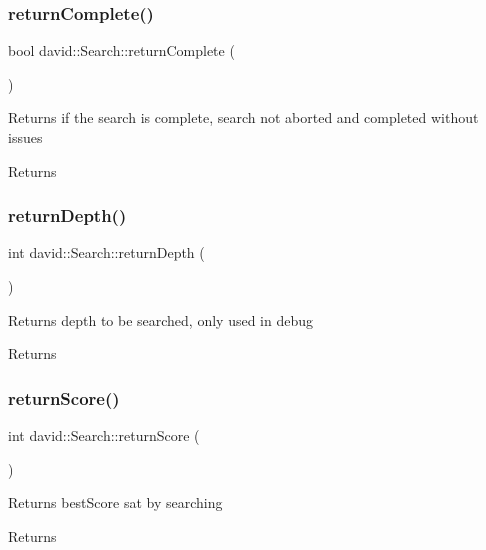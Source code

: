 \subsubsection{\texorpdfstring{return\+Complete()}{returnComplete()}}
{\footnotesize\ttfamily bool david\+::\+Search\+::return\+Complete (\begin{DoxyParamCaption}{ }\end{DoxyParamCaption})}

Returns if the search is complete, search not aborted and completed without issues \begin{DoxyReturn}{Returns}

\end{DoxyReturn}
\mbox{\label{classdavid_1_1Search_aca35880f4373631acf04f5e394470c1f}} 
\subsubsection{\texorpdfstring{return\+Depth()}{returnDepth()}}
{\footnotesize\ttfamily int david\+::\+Search\+::return\+Depth (\begin{DoxyParamCaption}{ }\end{DoxyParamCaption})}

Returns depth to be searched, only used in debug \begin{DoxyReturn}{Returns}

\end{DoxyReturn}
\mbox{\label{classdavid_1_1Search_a4986ca7138add256e0c6e974e66c1c25}} 
\subsubsection{\texorpdfstring{return\+Score()}{returnScore()}}
{\footnotesize\ttfamily int david\+::\+Search\+::return\+Score (\begin{DoxyParamCaption}{ }\end{DoxyParamCaption})}

Returns best\+Score sat by searching \begin{DoxyReturn}{Returns}

\end{DoxyReturn}
\mbox{\label{classdavid_1_1Search_aa61a42ed269f910f0fdc41c050c3e195}} 
